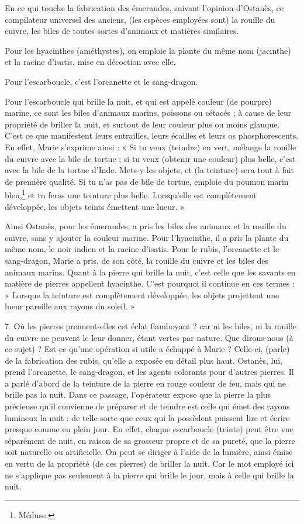 \documentclass[a4paper, 11pt, oneside, polutonikogreek, french]{article}
\begin{document}
En ce qui touche la fabrication des émeraudes, suivant l'opinion d'Ostanès, ce compilateur universel des anciens, (les espèces employées sont) la rouille du cuivre, les biles de toutes sortes d'animaux et matières similaires.

Pour les hyacinthes (améthystes), on emploie la plante du même nom (jacinthe) et la racine d'isatis, mise en décoction avec elle.

Pour l'escarboucle, c'est l'orcanette et le sang-dragon.

Pour l'escarboucle qui brille la nuit, et qui est appelé couleur (de pourpre) marine, ce sont les biles d'animaux marins, poissons ou cétacés ; à cause de leur propriété de briller la nuit, et surtout de leur couleur plus ou moins glauque. C'est ce que manifestent leurs entrailles, leurs écailles et leurs os phosphorescents. En effet, Marie s'exprime ainsi : « Si tu veux (teindre) en vert, mélange la rouille du cuivre avec la bile de tortue ; si tu veux (obtenir une couleur) plus belle, c'est avec la bile de la tortue d'Inde. Mets-y les objets, et (la teinture) sera tout à fait de première qualité. Si tu n'as pas de bile de tortue, emploie du poumon marin bleu,\footnote{Méduse.} et tu feras une teinture plus belle. Lorsqu'elle est complètement développée, les objets teints émettent une lueur. »

Ainsi Ostanès, pour les émeraudes, a pris les biles des animaux et la rouille du cuivre, sans y ajouter la couleur marine. Pour l'hyacinthe, il a pris la plante du même nom, le noir indien et la racine d'isatis. Pour le rubis, l'orcanette et le sang-dragon, Marie a pris, de son côté, la rouille du cuivre et les biles des animaux marins. Quant à la pierre qui brille la nuit, c'est celle que les savants en matière de pierres appellent hyacinthe. C'est pourquoi il continue en ces termes : « Lorsque la teinture est complètement développée, les objets projettent une lueur pareille aux rayons du soleil. »

7. Où les pierres prennent-elles cet éclat flamboyant ? car ni les biles, ni la rouille du cuivre ne peuvent le leur donner, étant vertes par nature. Que dirons-nous (à ce sujet) ? Est-ce qu'une opération si utile a échappé à Marie ? Celle-ci, (parle) de la fabrication des rubis, qu'elle a exposée en détail plus haut. Ostanès, lui, prend l'orcanette, le sang-dragon, et les agents colorants pour d'autres pierres. Il a parlé d'abord de la teinture de la pierre en rouge couleur de feu, mais qui ne brille pas la nuit. Dans ce passage, l'opérateur expose que la pierre la plus précieuse qu'il convienne de préparer et de teindre est celle qui émet des rayons lumineux la nuit : de telle sorte que ceux qui la possèdent puissent lire et écrire presque comme en plein jour. En effet, chaque escarboucle (teinte) peut être vue séparément de nuit, en raison de sa grosseur propre et de sa pureté, que la pierre soit naturelle ou artificielle. On peut se diriger à l'aide de la lumière, ainsi émise en vertu de la propriété (de ces pierres) de briller la nuit. Car le mot employé ici ne s'applique pas seulement à la pierre qui brille le jour, mais à celle qui brille la nuit.
\end{document}
